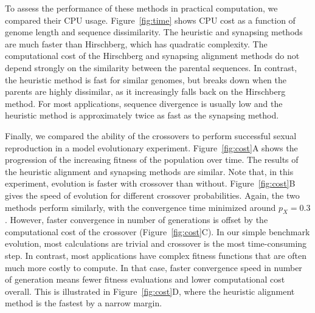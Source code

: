\documentclass[10pt]{article}
\renewcommand{\paragraph}[1]{\textbf{#1}\hspace{2ex}}
\renewcommand{\paragraph}[1]{}
\begin{document}
\paragraph{CPU time consumption} To assess the performance of these methods in
practical computation, we compared their CPU usage. Figure~\ref{fig:time} shows
CPU cost as a function of genome length and sequence dissimilarity. The heuristic
and synapsing methods are much faster than Hirschberg, which has quadratic
complexity.
The computational cost of the Hirschberg and synapsing alignment methods do not
depend strongly on the similarity between the parental sequences. In contrast,
the heuristic method is fast for similar genomes, but breaks down when the parents are
highly dissimilar, as it increasingly falls back on the Hirschberg method.
For most applications, sequence divergence is usually low and the heuristic method
is approximately twice as fast as the synapsing method.

\paragraph{Evolutionary success} Finally, we compared the ability of the
crossovers to perform successful sexual reproduction in a model evolutionary
experiment. Figure~\ref{fig:cost}A shows the progression of the increasing fitness of
the population over time. The results of the heuristic alignment and synapsing methods
are similar. Note that, in this experiment, evolution is faster with crossover than
without. Figure~\ref{fig:cost}B gives the speed of evolution
for different crossover probabilities. Again, the two methods perform similarly,
with the convergence time minimized around $p_X=0.3$. However, faster convergence
in number of generations is offset by the computational cost of the crossover (Figure~\ref{fig:cost}C).
In our simple benchmark evolution, most calculations are trivial and crossover is
the most time-consuming step. In contrast, most applications have complex fitness functions
that are often much more costly to compute.
In that case, faster convergence speed in number of generation means fewer
fitness evaluations and lower computational cost overall. This is
illustrated in Figure~\ref{fig:cost}D, where the heuristic alignment
method is the fastest by a narrow margin.
\end{document}
